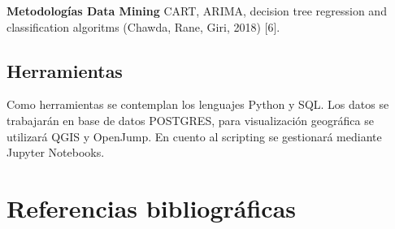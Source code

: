 \documentclass{article}
\theoremstyle{mytheoremstyle}
\theoremstyle{mytheoremstyle}
\theoremstyle{myproblemstyle}
\begin{document}
 
\textbf{Metodologías Data Mining}
CART, ARIMA, decision tree regression and classification algoritms (Chawda, Rane, Giri, 2018) [6]. 
\subsection{Herramientas }
Como herramientas se contemplan los lenguajes Python y SQL. Los datos se trabajarán en base de datos POSTGRES, para visualización geográfica se utilizará QGIS y OpenJump. En cuento al scripting se gestionará mediante Jupyter Notebooks. 

\section{Referencias bibliográficas}
\end{document}

